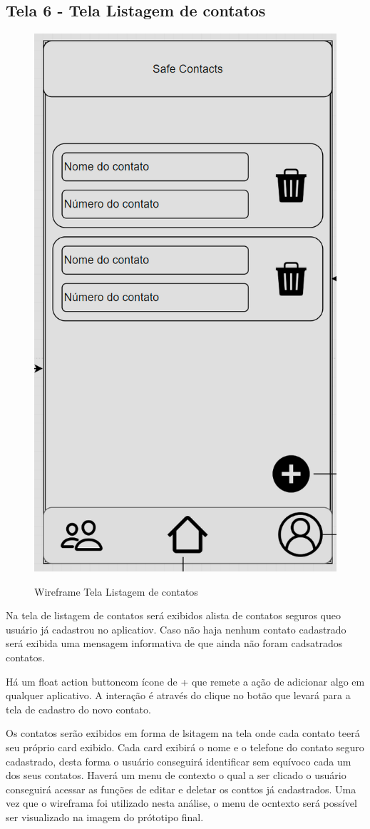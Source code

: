 \subsection{Tela 6 - Tela Listagem de contatos}
\begin{figure}[h]
  \begin{center}
  \includegraphics[width=0.2\linewidth]{images/wire-tela-listagem-contatos.png}\\
  \end{center}
  \caption[Wireframe Tela Listagem de contatos]{Wireframe Tela Listagem de contatos}
  \label{fig:wireframe-tela-listagem-contatos}
\end{figure}
\pagebreak
Na tela de listagem de contatos será exibidos alista de contatos seguros queo usuário já cadastrou no aplicatiov. Caso não haja nenhum contato cadastrado será exibida uma mensagem informativa de que ainda não foram cadsatrados contatos. 

Há um float action buttoncom ícone de + que remete a ação de adicionar algo em qualquer aplicativo. A interação é através do clique no botão que levará para a tela de cadastro do novo contato.

Os contatos serão exibidos em forma de lsitagem na tela onde cada contato teerá seu próprio card exibido. Cada card exibirá o nome e o telefone do contato seguro cadastrado, desta forma o usuário conseguirá identificar sem equívoco cada um dos seus contatos. Haverá um menu de contexto o qual a ser clicado o usuário conseguirá acessar as funções de editar e deletar os conttos já cadastrados. Uma vez que o wireframa foi utilizado nesta análise, o menu de ocntexto será possível ser visualizado na imagem do prótotipo final. 

